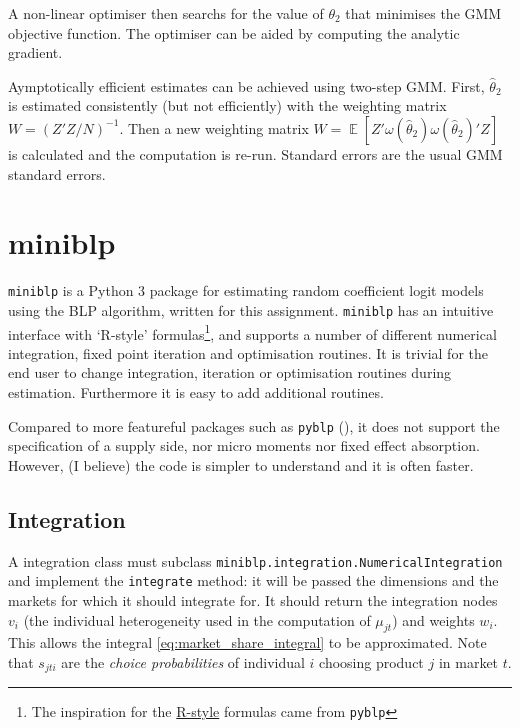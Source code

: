 \documentclass[parskip=half]{scrartcl}
\DeclareMathOperator{\E}{\mathbb{E}}
\newcommand{\code}[1]{\texttt{#1}}
\begin{document}
A non-linear optimiser then searchs for the value of \(\theta_2\) that minimises the GMM objective function. The optimiser can be aided by computing the analytic gradient.

Aymptotically efficient estimates can be achieved using two-step GMM. First, \(\hat{\theta}_2\) is estimated consistently (but not efficiently) with the weighting matrix \(W = (Z'Z/N)^{-1}\). Then a new weighting matrix \(W = \E[Z'\omega(\hat{\theta}_2)\omega(\hat{\theta}_2)'Z]\) is calculated and the computation is re-run. Standard errors are the usual GMM standard errors.

\section{miniblp}

\code{miniblp} is a Python 3 package for estimating random coefficient logit models using the BLP algorithm, written for this assignment. \code{miniblp} has an intuitive interface with `R-style' formulas\footnote{The inspiration for the \href{https://patsy.readthedocs.io/en/latest/}{R-style} formulas came from \code{pyblp}}, and supports a number of different numerical integration, fixed point iteration and optimisation routines. It is trivial for the end user to change integration, iteration or optimisation routines during estimation. Furthermore it is easy to add additional routines.

Compared to more featureful packages such as \code{pyblp} (\cite{conlon2019best}), it does not support the specification of a supply side, nor micro moments nor fixed effect absorption. However, (I believe) the code is simpler to understand and it is often faster.

\subsection{Integration}

A integration class must subclass \code{miniblp.integration.NumericalIntegration} and implement the \code{integrate} method: it will be passed the dimensions and the markets for which it should integrate for. It should return the integration nodes \(v_i\) (the individual heterogeneity used in the computation of \(\mu_{jt}\)) and weights \(w_i\). This allows the integral \eqref{eq:market_share_integral} to be approximated. Note that \(s_{jti}\) are the \emph{choice probabilities} of individual \(i\) choosing product \(j\) in market \(t\).
\end{document}
